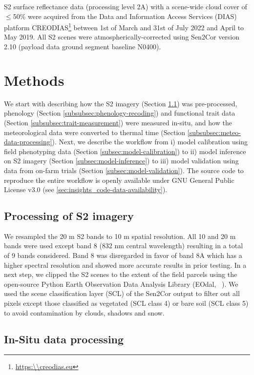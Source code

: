 S2 surface reflectance data (processing level 2A) with a scene-wide cloud cover of $\le$50\% were acquired from the Data and Information Access Services (DIAS) platform CREODIAS\footnote{\url{https:\\creodias.eu}} between 1st of March and 31st of July 2022 and April to May 2019. All \gls{S2} scenes were atmospherically-corrected using Sen2Cor version 2.10 (payload data ground segment baseline N0400).

\section{Methods}
\label{sec:insights_methods}
% 
We start with describing how the \gls{S2} imagery (Section \ref{subsec:process-s2}) was pre-processed, phenology (Section \ref{subsubsec:phenology-recoding}) and functional trait data (Section \ref{subsubsec:trait-measurement}) were measured in-situ, and how the meteorological data were converted to thermal time (Section \ref{subsubsec:meteo-data-processing}). Next, we describe the workflow from i) model calibration using field phenotyping data (Section \ref{subsec:model-calibration}) to ii) model inference on \gls{S2} imagery (Section \ref{subsec:model-inference}) to iii) model validation using data from on-farm trials (Section \ref{subsec:model-validation}). The source code to reproduce the entire workflow is openly available under GNU General Public License v3.0 (see \ref{sec:insights_code-data-availability}).

\subsection{Processing of \gls{S2} imagery}
\label{subsec:process-s2}
We resampled the 20 m \gls{S2} bands to 10 m spatial resolution. All 10 and 20 m bands were used except band 8 (832 nm central wavelength) resulting in a total of 9 bands considered. Band 8 was disregarded in favor of band 8A which has a higher spectral resolution and showed more accurate results in prior testing. In a next step, we clipped the \gls{S2} scenes to the extent of the field parcels using the open-source Python Earth Observation Data Analysis Library (EOdal, ~\citet{graf_eodal_2022}). We used the scene classification layer (SCL) of the Sen2Cor output to filter out all pixels except those classified as vegetated (SCL class 4) or bare soil (SCL class 5) to avoid contamination by clouds, shadows and snow.

\subsection{In-Situ data processing}
\label{subsec:in-situ-data-processing}

